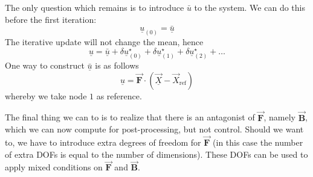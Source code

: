 \documentclass[times,namecite]{goose-article}
\begin{document}
The only question which remains is to introduce $\bar{u}$ to the system. We can do this before the first iteration:
\begin{equation}
  \underline{u}_{(0)} = \underline{\bar{u}}
\end{equation}
The iterative update will not change the mean, hence
\begin{equation}
  \underline{u}
  =
  \underline{\bar{u}}
  +
  \delta \underline{u}^\star_{(0)}
  +
  \delta \underline{u}^\star_{(1)}
  +
  \delta \underline{u}^\star_{(2)}
  +
  \ldots
\end{equation}
One way to construct $\underline{\bar{u}}$ is as follows
\begin{equation}
  \underline{u} = \vec{\bm{F}} \cdot ( \underline{\vec{X}} - \vec{X}_\mathrm{ref} )
\end{equation}
whereby we take node $1$ as reference.

The final thing we can to is to realize that there is an antagonist of $\vec{\bm{F}}$, namely $\vec{\bm{B}}$, which we can now compute for post-processing, but not control. Should we want to, we have to introduce extra degrees of freedom for $\vec{\bm{F}}$ (in this case the number of extra DOFs is equal to the number of dimensions). These DOFs can be used to apply mixed conditions on $\vec{\bm{F}}$ and $\vec{\bm{B}}$.
\end{document}
